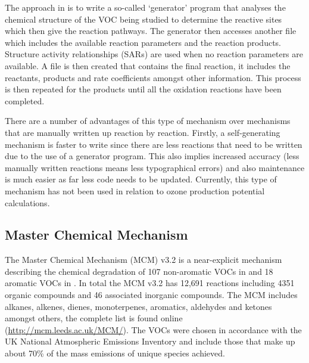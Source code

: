 The approach in \citep{Aumont:2005} is to write a so-called `generator' program that analyses the chemical structure of the VOC being studied to determine the reactive sites which then give the reaction pathways. 
The generator then accesses another file which includes the available reaction parameters and the reaction products. 
Structure activity relationships (SARs) are used when no reaction parameters are available. 
A file is then created that contains the final reaction, it includes the reactants, products and rate coefficients amongst other information. 
This process is then repeated for the products until all the oxidation reactions have been completed.

There are a number of advantages of this type of mechanism over mechanisms that are manually written up reaction by reaction. 
Firstly, a self-generating mechanism is faster to write since there are less reactions that need to be written due to the use of a generator program. 
This also implies increased accuracy (less manually written reactions means less typographical errors) and also maintenance is much easier as far less code needs to be updated. 
Currently, this type of mechanism has not been used in relation to ozone production potential calculations. 

\subsection{Master Chemical Mechanism}
The Master Chemical Mechanism (MCM) v3.2 is a near-explicit mechanism describing the chemical degradation of 107 non-aromatic VOCs in \citep{Saunders:2003} and 18 aromatic VOCs in \citep{Jenkin:2003}. 
In total the MCM v3.2 has 12,691 reactions including 4351 organic compounds and 46 associated inorganic compounds. 
The MCM includes alkanes, alkenes, dienes, monoterpenes, aromatics, aldehydes and ketones amongst others, the complete list is found online (\url{http://mcm.leeds.ac.uk/MCM/}). 
The VOCs were chosen in accordance with the UK National Atmospheric Emissions Inventory and include those that make up about 70\% of the mass emissions of unique species achieved.

